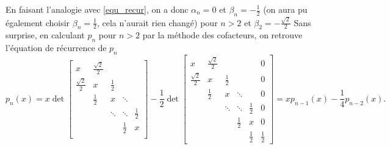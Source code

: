 En faisant l'analogie avec \eqref{equ_recur},
on a donc $\alpha_n = 0$ et $\beta_n = -\frac{1}{2}$
(on aura pu également choisir $\beta_n = \frac{1}{2}$,
cela n'aurait rien changé) pour $n > 2$ et $\beta_2 = -\frac{\sqrt{2}}{2}$
Sans surprise,
en calculant $p_n$ pour $n > 2$ par la méthode des cofacteurs,
on retrouve l'équation de récurrence de $p_n$
$$
p_n(x) = x \det
\left[
\begin{array}{ccccc}
  x & \frac{\sqrt{2}}{2} & & &  \\
  \frac{\sqrt{2}}{2} & x & \frac 12 & & \\
 & \frac 12 & x & \ddots & \\
 & & \ddots & \ddots & \frac 12  \\
 & & & \frac 12 & x   \\
\end{array}
\right] - \frac 12\det
\left[
\begin{array}{cccccc}
  x & \frac{\sqrt{2}}{2} & & & & 0 \\
  \frac{\sqrt{2}}{2} & x & \frac 12 & & & 0\\
 & \frac 12 & x & \ddots & & 0\\
 & & \ddots & \ddots & \frac 12 & 0\\
 & & & \frac 12 & x &  0\\
 & & & &  \frac 12 &  \frac 12
\end{array}
\right] = xp_{n-1}(x)-\frac{1}{4}p_{n-2}(x).
$$

